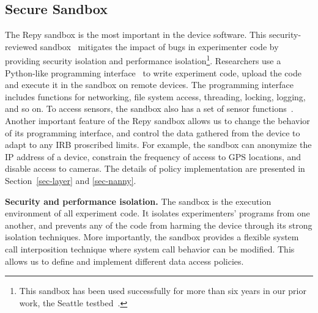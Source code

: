 \subsection{Secure Sandbox}\label{sec-sandbox}
The Repy sandbox is the most important in the device software. This 
security-reviewed sandbox~\cite{cappos2010retaining} mitigates the 
impact of bugs in experimenter code by providing security isolation 
and performance isolation\footnote{\scriptsize 
This sandbox has been used successfully for more than six years in our 
prior work, the Seattle testbed~\cite{seattle}.}. 
Researchers use a Python-like programming interface~\cite{repyv2}
to write experiment code, upload the code and execute it in the
sandbox on remote devices. The programming interface includes functions for networking, 
file system access, threading, locking, logging, and so on. To access sensors, 
the sandbox also has a set of sensor functions~\cite{sensors}. 
%
Another important feature of the Repy sandbox allows us to change the 
behavior of its programming interface, and control the 
data gathered from the device to adapt to any IRB proscribed limits. 
For example, the sandbox can anonymize the IP address of a device, constrain  
the frequency of access to GPS locations, and disable
access to cameras. 
The details of policy implementation are presented in 
Section~\ref{sec-layer} and \ref{sec-nanny}.

\textbf{Security and performance isolation.}
The sandbox is the execution environment 
of all experiment code. It isolates experimenters' programs from one 
another, and prevents any of the code from harming the device 
through its strong isolation techniques. More importantly, the sandbox
provides a flexible system call interposition technique where system call behavior 
can be modified. This allows us to define and implement
different data access policies. 

